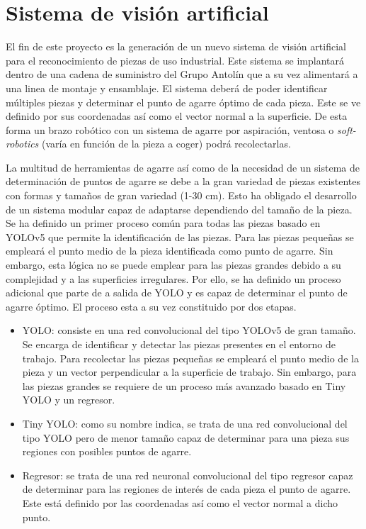 \chapter{Sistema de visión artificial}
\label{chap:Sistema de visión artificial}

El fin de este proyecto es la generación de un nuevo sistema de visión artificial para el reconocimiento de piezas de uso industrial. Este sistema se implantará dentro de una cadena de suministro del Grupo Antolín\textsuperscript{\textregistered} que a su vez alimentará a una linea de montaje y ensamblaje. El sistema deberá de poder identificar múltiples piezas y determinar el punto de agarre óptimo de cada pieza. Este se ve definido por sus coordenadas así como el vector normal a la superficie. De esta forma un brazo robótico con un sistema de agarre por aspiración, ventosa o \textit{soft-robotics} (varía en función de la pieza a coger) podrá recolectarlas.

La multitud de herramientas de agarre así como de la necesidad de un sistema de determinación de puntos de agarre se debe a la gran variedad de piezas existentes con formas y tamaños de gran variedad (1-30 cm). Esto ha obligado el desarrollo de un sistema modular capaz de adaptarse dependiendo del tamaño de la pieza. Se ha definido un primer proceso común para todas las piezas basado en YOLOv5 que permite la identificación de las piezas. Para las piezas pequeñas se empleará el punto medio de la pieza identificada como punto de agarre. Sin embargo, esta lógica no se puede emplear para las piezas grandes debido a su complejidad y a las superficies irregulares. Por ello, se ha definido un proceso adicional que parte de a salida de YOLO y es capaz de determinar el punto de agarre óptimo. El proceso esta a su vez constituido por dos etapas.

\begin{itemize}
\item YOLO: consiste en una red convolucional del tipo YOLOv5 de gran tamaño. Se encarga de identificar y detectar las piezas presentes en el entorno de trabajo. Para recolectar las piezas pequeñas se empleará el punto medio de la pieza y un vector perpendicular a la superficie de trabajo. Sin embargo, para las piezas grandes se requiere de un proceso más avanzado basado en Tiny YOLO y un regresor.
\item Tiny YOLO: como su nombre indica, se trata de una red convolucional del tipo YOLO pero de menor tamaño capaz de determinar para una pieza sus regiones con posibles puntos de agarre.
\item Regresor: se trata de una red neuronal convolucional del tipo regresor capaz de determinar para las regiones de interés de cada pieza el punto de agarre. Este está definido por las coordenadas así como el vector normal a dicho punto.
\end{itemize}

